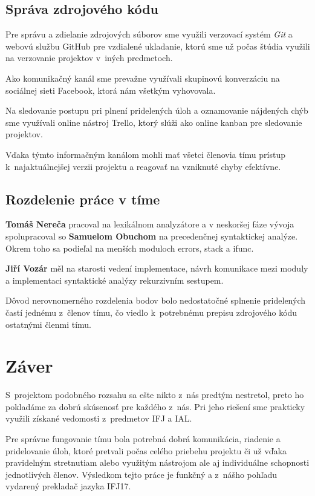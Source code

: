 \documentclass{article}
\begin{document}
        \subsection{Správa zdrojového kódu}
        Pre správu a zdielanie zdrojových súborov sme využili verzovací systém \emph{Git} a webovú službu GitHub pre vzdialené ukladanie, ktorú sme už 
        počas štúdia využili na verzovanie projektov v~iných predmetoch.
        
        Ako komunikačný kanál sme 
        prevažne využívali skupinovú konverzáciu na sociálnej sieti Facebook, ktorá nám všetkým 
        vyhovovala.
        
        Na sledovanie postupu pri plnení pridelených úloh a oznamovanie nájdených chýb 
        sme využívali online nástroj Trello, ktorý slúži ako online kanban pre sledovanie projektov. 
        
        Vďaka týmto informačným kanálom mohli mať všetci členovia tímu prístup k~najaktuálnejšej
        verzii projektu a reagovať na vzniknuté chyby efektívne.

        \subsection{Rozdelenie práce v tíme}

        \textbf{Tomáš Nereča} pracoval na lexikálnom analyzátore a v neskoršej fáze vývoja spolupracoval so \textbf{Samuelom Obuchom} na 
        precedenčnej syntaktickej analýze. Okrem toho sa podieľal na menších moduloch errors, stack a ifunc. 

        \textbf{Jiří Vozár} měl na starosti vedení implementace, návrh komunikace mezi moduly a implementaci syntaktické analýzy rekurzivním sestupem.

        Dôvod nerovnomerného rozdelenia bodov bolo nedostatočné splnenie pridelených častí jednému 
        z~členov tímu, čo viedlo k~potrebnému prepisu zdrojového kódu ostatnými členmi tímu.

    \section{Záver}
    S~projektom podobného rozsahu sa ešte nikto z~nás predtým nestretol, preto ho pokladáme za dobrú
    skúsenosť pre každého z~nás. Pri jeho riešení sme prakticky využili získané vedomosti z~predmetov 
    IFJ a IAL.
    
    Pre správne fungovanie tímu bola potrebná dobrá komunikácia, riadenie a pridelovanie úloh, ktoré pretvali počas celého
    priebehu projektu či už vďaka pravidelným stretnutiam alebo využitým nástrojom ale aj individuálne
    schopnosti jednotlivých členov. Výsledkom tejto práce je funkčný a z~nášho pohľadu vydarený 
    prekladač jazyka IFJ17.
    
\end{document}
